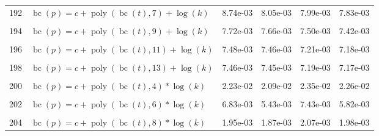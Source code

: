 \documentclass[12pt,a4paper]{article}
\DeclareMathOperator{\bc}{bc}
\DeclareMathOperator{\poly}{poly}
\begin{document}
\begin{longtable}[t]{ll>{\raggedleft\arraybackslash}p{2cm}>{\raggedleft\arraybackslash}p{2cm}>{\raggedleft\arraybackslash}p{2cm}>{\raggedleft\arraybackslash}p{2cm}}
192 & $\bc(p) = c + \poly\left( \bc(t), 7 \right) + \log(k)$ & 8.74e-03 & 8.05e-03 & 7.99e-03 & 7.83e-03\\
\cellcolor{gray!6}{193} & \cellcolor{gray!6}{$\bc(p) = c + \poly\left( \bc(t), 8 \right) + \log(k)$} & \cellcolor{gray!6}{7.65e-03} & \cellcolor{gray!6}{7.62e-03} & \cellcolor{gray!6}{7.40e-03} & \cellcolor{gray!6}{7.36e-03}\\
194 & $\bc(p) = c + \poly\left( \bc(t), 9 \right) + \log(k)$ & 7.72e-03 & 7.66e-03 & 7.50e-03 & 7.42e-03\\
\cellcolor{gray!6}{195} & \cellcolor{gray!6}{$\bc(p) = c + \poly\left( \bc(t), 10 \right) + \log(k)$} & \cellcolor{gray!6}{7.47e-03} & \cellcolor{gray!6}{7.45e-03} & \cellcolor{gray!6}{7.20e-03} & \cellcolor{gray!6}{7.18e-03}\\
196 & $\bc(p) = c + \poly\left( \bc(t), 11 \right) + \log(k)$ & 7.48e-03 & 7.46e-03 & 7.21e-03 & 7.18e-03\\
\cellcolor{gray!6}{197} & \cellcolor{gray!6}{$\bc(p) = c + \poly\left( \bc(t), 12 \right) + \log(k)$} & \cellcolor{gray!6}{7.46e-03} & \cellcolor{gray!6}{7.45e-03} & \cellcolor{gray!6}{7.19e-03} & \cellcolor{gray!6}{7.17e-03}\\
198 & $\bc(p) = c + \poly\left( \bc(t), 13 \right) + \log(k)$ & 7.46e-03 & 7.45e-03 & 7.19e-03 & 7.17e-03\\
\cellcolor{gray!6}{199} & \cellcolor{gray!6}{$\bc(p) = c + \poly\left( \bc(t), 3 \right) * \log(k)$} & \cellcolor{gray!6}{5.55e-02} & \cellcolor{gray!6}{1.72e-02} & \cellcolor{gray!6}{1.91e-02} & \cellcolor{gray!6}{1.79e-02}\\
200 & $\bc(p) = c + \poly\left( \bc(t), 4 \right) * \log(k)$ & 2.23e-02 & 2.09e-02 & 2.35e-02 & 2.26e-02\\
\cellcolor{gray!6}{201} & \cellcolor{gray!6}{$\bc(p) = c + \poly\left( \bc(t), 5 \right) * \log(k)$} & \cellcolor{gray!6}{9.10e-03} & \cellcolor{gray!6}{9.08e-03} & \cellcolor{gray!6}{8.72e-03} & \cellcolor{gray!6}{8.72e-03}\\
202 & $\bc(p) = c + \poly\left( \bc(t), 6 \right) * \log(k)$ & 6.83e-03 & 5.43e-03 & 7.43e-03 & 5.82e-03\\
\cellcolor{gray!6}{203} & \cellcolor{gray!6}{$\bc(p) = c + \poly\left( \bc(t), 7 \right) * \log(k)$} & \cellcolor{gray!6}{3.91e-03} & \cellcolor{gray!6}{2.83e-03} & \cellcolor{gray!6}{3.21e-03} & \cellcolor{gray!6}{2.94e-03}\\
204 & $\bc(p) = c + \poly\left( \bc(t), 8 \right) * \log(k)$ & 1.95e-03 & 1.87e-03 & 2.07e-03 & 1.98e-03\\

\end{longtable}
\end{document}
